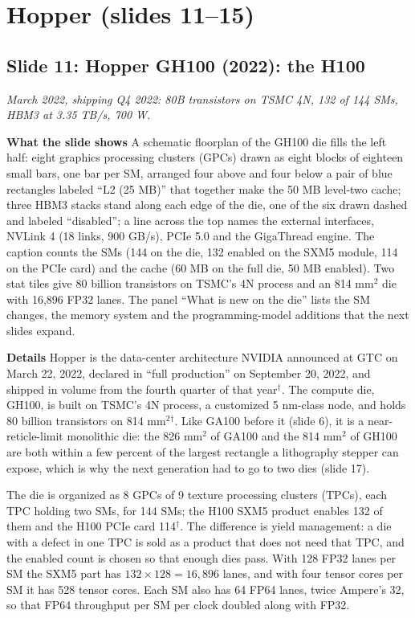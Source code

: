 \documentclass[11pt,letterpaper]{article}
\newcommand{\setstage}[1]{\colorlet{stagec}{#1}}
\newcommand{\slide}[3]{%
  \subsection[Slide #1: #2]{Slide #1: #2}%
  {\color{muted}\itshape #3\par}\medskip}
\newcommand{\para}[1]{\medskip\noindent\textbf{#1}\quad}
\begin{document}
\setstage{attn}
\section{Hopper (slides 11--15)}

\slide{11}{Hopper GH100 (2022): the H100}{March 2022, shipping Q4 2022: 80B transistors on TSMC 4N, 132 of 144 SMs, HBM3 at 3.35 TB/s, 700 W.}

\para{What the slide shows} A schematic floorplan of the GH100 die fills the left half: eight graphics processing clusters (GPCs) drawn as eight blocks of eighteen small bars, one bar per SM, arranged four above and four below a pair of blue rectangles labeled ``L2 (25 MB)'' that together make the 50 MB level-two cache; three HBM3 stacks stand along each edge of the die, one of the six drawn dashed and labeled ``disabled''; a line across the top names the external interfaces, NVLink 4 (18 links, 900 GB/s), PCIe 5.0 and the GigaThread engine. The caption counts the SMs (144 on the die, 132 enabled on the SXM5 module, 114 on the PCIe card) and the cache (60 MB on the full die, 50 MB enabled). Two stat tiles give 80 billion transistors on TSMC's 4N process and an 814 mm$^2$ die with 16{,}896 FP32 lanes. The panel ``What is new on the die'' lists the SM changes, the memory system and the programming-model additions that the next slides expand.

\para{Details} Hopper is the data-center architecture NVIDIA announced at GTC on March 22, 2022, declared in ``full production'' on September 20, 2022, and shipped in volume from the fourth quarter of that year$^\dagger$. The compute die, GH100, is built on TSMC's 4N process, a customized 5 nm-class node, and holds 80 billion transistors on 814 mm$^2$$^\dagger$. Like GA100 before it (slide 6), it is a near-reticle-limit monolithic die: the 826 mm$^2$ of GA100 and the 814 mm$^2$ of GH100 are both within a few percent of the largest rectangle a lithography stepper can expose, which is why the next generation had to go to two dies (slide 17).

The die is organized as 8 GPCs of 9 texture processing clusters (TPCs), each TPC holding two SMs, for 144 SMs; the H100 SXM5 product enables 132 of them and the H100 PCIe card 114$^\dagger$. The difference is yield management: a die with a defect in one TPC is sold as a product that does not need that TPC, and the enabled count is chosen so that enough dies pass. With 128 FP32 lanes per SM the SXM5 part has $132\times128=16{,}896$ lanes, and with four tensor cores per SM it has 528 tensor cores. Each SM also has 64 FP64 lanes, twice Ampere's 32, so that FP64 throughput per SM per clock doubled along with FP32.
\end{document}
